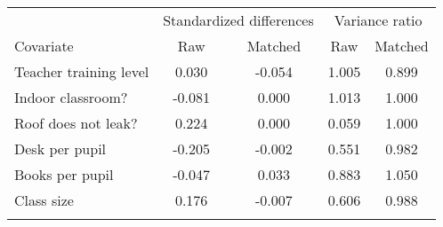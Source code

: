 \begin{center}
\begin{tabular}{lcccc}
\hline \noalign{\smallskip} & \multicolumn{2}{c}{Standardized differences} & \multicolumn{2}{c}{Variance ratio}\\
Covariate & Raw & Matched & Raw & Matched\\
\noalign{\smallskip}\hline \noalign{\smallskip}Teacher training level & 0.030 & -0.054 & 1.005 & 0.899\\
Indoor classroom? & -0.081 & 0.000 & 1.013 & 1.000\\
Roof does not leak? & 0.224 & 0.000 & 0.059 & 1.000\\
Desk per pupil & -0.205 & -0.002 & 0.551 & 0.982\\
Books per pupil & -0.047 & 0.033 & 0.883 & 1.050\\
Class size & 0.176 & -0.007 & 0.606 & 0.988\\
\noalign{\smallskip}\hline\end{tabular}\\
\end{center}
